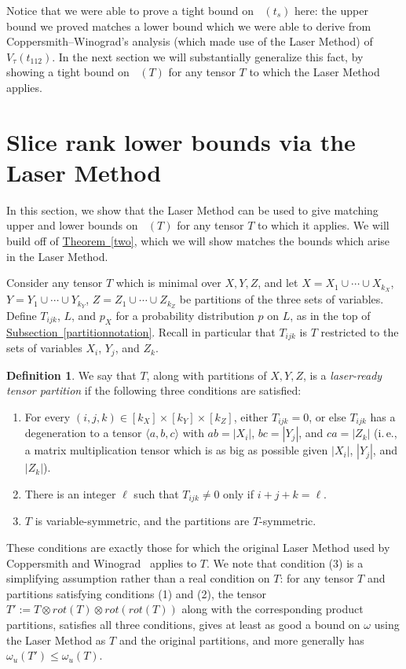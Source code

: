 \documentclass[11pt]{article}
\numberwithin{equation}{section}
\theoremstyle{definition}
\newtheorem{definition}[theorem]{Definition}
\theoremstyle{plain}
\newcommand{\ie}{i.\,e.}
\newcommand{\expref}[2]{\hyperref[#2]{#1~\ref{#2}}}
\newcommand{\tsr}{\mathop{\tilde{\operatorname{S}}}}
\theoremstyle{definition}
\begin{document}
Notice that we were able to prove a tight bound on $\tsr(t_s)$ here: the upper bound we proved matches a lower bound which we were able to derive from Coppersmith--Winograd's analysis (which made use of the Laser Method) of $V_\tau(t_{112})$. In the next section we will substantially generalize this fact, by showing a tight bound on $\tsr(T)$ for any tensor $T$ to which the Laser Method applies.

%
\section{Slice rank lower bounds via the Laser Method} \label{lasersec}

In this section, we show that the Laser Method can be used to give matching upper and lower bounds on $\tsr(T)$ for any tensor $T$ to which it applies. We will build off of \expref{Theorem}{two}, which we will show matches the bounds which arise in the Laser Method.

Consider any tensor $T$ which is minimal over $X,Y,Z$, and let $X = X_1 \cup \cdots \cup X_{k_X}$, $Y = Y_1 \cup \cdots \cup Y_{k_Y}$, $Z = Z_1 \cup \cdots \cup Z_{k_Z}$ be partitions of the three  
%
sets of variables. 
Define $T_{ijk}$, $L$, and $p_X$ for a probability distribution $p$ on $L$, as in the top of \expref{Subsection}{partitionnotation}. Recall in particular that $T_{ijk}$ is $T$ restricted to the  
%
sets of variables
$X_i$, $Y_j$, and $Z_k$.

\begin{definition} \label{laserable}
We say that $T$, along with partitions of $X,Y,Z$, is a \emph{laser-ready tensor partition} if the following three conditions are satisfied:
\begin{enumerate}[(1)]
    \item For every $(i,j,k) \in [k_X] \times [k_Y] \times [k_Z]$, either $T_{ijk} = 0$, or else $T_{ijk}$ has a degeneration to a tensor $\langle a,b,c \rangle$ with $ab = |X_i|$, $bc = |Y_j|$, and $ca = |Z_k|$ (\ie, a matrix multiplication tensor which is as big as possible given $|X_i|$, $|Y_j|$, and $|Z_k|$).
    \item There is an integer $\ell$ such that $T_{ijk} \neq 0$ only if $i+j+k=\ell$.
    \item $T$ is variable-symmetric, and the partitions are $T$-symmetric.
\end{enumerate}
\end{definition}

These conditions are exactly those for which the original Laser Method used by Coppersmith and Winograd~\cite{coppersmith} applies to $T$. We note that condition (3) is a simplifying assumption rather than a real condition on $T$: for any tensor $T$ and partitions satisfying conditions (1) and (2), the tensor $T' := T \otimes rot(T) \otimes rot(rot(T))$ along with the corresponding product partitions, satisfies all three conditions, gives at least as good a bound on $\omega$ using the Laser Method as $T$ and the original partitions, and more generally has $\omega_u(T') \leq \omega_u(T)$.
\end{document}
